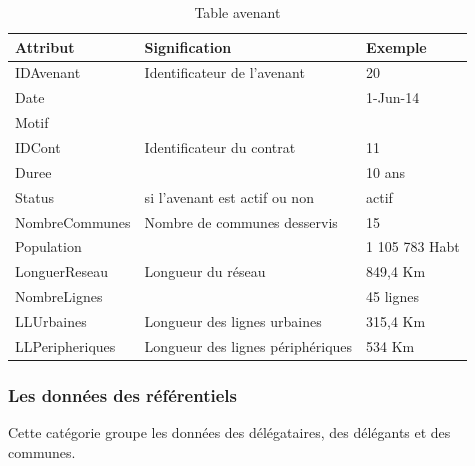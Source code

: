 \documentclass[a4paper]{report}
\begin{document}
\begin{doublespace}
	\begin{table}[H]
		\begin{center}
			\begin{tabularx}{17.5cm}{|X|X|X|}
				\hline
				\textbf{Attribut} & \textbf{Signification}            &
				\textbf{Exemple}                                                       \\
				\hline
				IDAvenant         & Identificateur de l'avenant       & 20             \\
				\hline
				Date              &                                   & 1-Jun-14       \\
				\hline
				Motif             &                                   &                \\
				\hline
				IDCont            & Identificateur du contrat         & 11             \\
				\hline
				Duree             &                                   & 10 ans         \\
				\hline
				Status            & si l’avenant est actif ou non     & actif          \\
				\hline
				NombreCommunes    & Nombre de communes desservis      & 15             \\
				\hline
				Population        &                                   & 1 105 783 Habt \\
				\hline
				LonguerReseau     & Longueur du réseau                & 849,4 Km       \\
				\hline
				NombreLignes      &                                   & 45 lignes      \\
				\hline
				LLUrbaines        & Longueur des lignes urbaines      & 315,4 Km       \\
				\hline
				LLPeripheriques   & Longueur des lignes périphériques & 534
				Km                                                                     \\
				\hline
			\end{tabularx}
			\caption{Table avenant}
		\end{center}
	\end{table}

    \subsubsection{Les données des référentiels}
    
    Cette catégorie groupe les données des délégataires, des délégants et des communes.


\end{doublespace}
\end{document}
